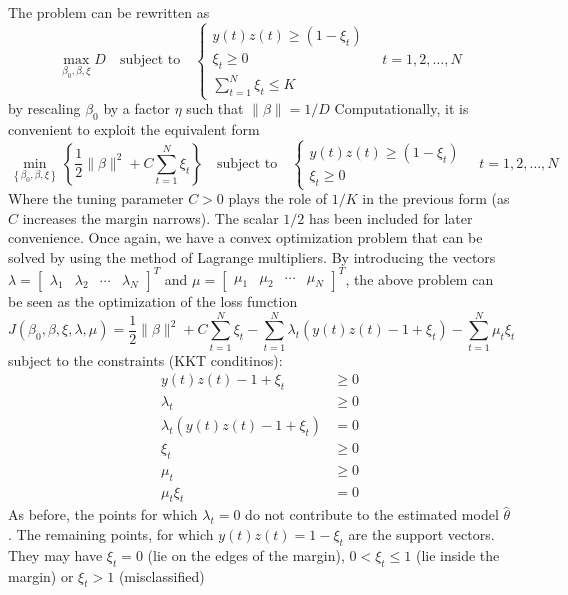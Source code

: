 \documentclass{book}
\theoremstyle{definition}
\theoremstyle{remark}
\theoremstyle{remark}
\begin{document}
The problem can be rewritten as 
\[
  \max_{\beta_0,\beta,\xi}D \quad \text{subject to} \quad \begin{cases}
    y(t)z(t)\geq (1-\xi_t)\\
    \xi_t \geq 0 \\
    \displaystyle\sum_{t=1}^{N}\xi_t \leq K
  \end{cases}\quad t=1,2,\dots,N
\]
by rescaling $\beta_0$ by a factor $\eta$ such that $\|\beta\|=1/D$ 
Computationally, it is convenient to exploit the equivalent form 
\[
    \min_{\left\{\beta_0,\beta,\xi\right\}}\left\{\displaystyle\frac{1}{2}\|\beta\|^2+C\displaystyle\sum_{t=1}^{N}\xi_t\right\} \quad \text{subject to}\quad \begin{cases}
    y(t)z(t) \geq (1-\xi_t)\\
    \xi_t \geq 0
  \end{cases} \quad t=1,2,\dots,N
\]
Where the tuning parameter $C>0$ plays the role of $1/K$ in the previous form (as $C$ increases the margin narrows). The scalar $1/2$ has been included for later convenience. Once again, we have a convex optimization problem that can be solved by using the method of Lagrange multipliers. By introducing the vectors $\lambda=\begin{bmatrix}
  \lambda_1 & \lambda_2 & \cdots & \lambda_N
\end{bmatrix}^T$ and $\mu=\begin{bmatrix}
  \mu_1 & \mu_2 & \cdots & \mu_N
\end{bmatrix}^T$, the above problem can be seen as the optimization of the loss function 
\[
  J(\beta_0,\beta,\xi,\lambda,\mu)=\displaystyle\frac{1}{2}\|\beta\|^2+C\displaystyle\sum_{t=1}^{N}\xi_t-\displaystyle\sum_{t=1}^{N}\lambda_t(y(t)z(t)-1+\xi_t)-\displaystyle\sum_{t=1}^{N}\mu_t\xi_t
\]
subject to the constraints (KKT conditinos): 
\begin{align*}
    y(t)z(t)-1+\xi_t &\geq 0\\
    \lambda_t &\geq 0\\
    \lambda_t\left(y(t)z(t)-1+\xi_t\right)&=0\\
    \xi_t &\geq0\\
    \mu_t &\geq 0 \\
    \mu_t\xi_t &= 0
\end{align*}
As before, the points for which $\lambda_t=0$ do not contribute to the estimated model $\hat{\theta}$. The remaining points, for which $y(t)z(t)=1-\xi_t$ are the support vectors. They may have $\xi_t=0$ (lie on the edges of the margin), $0<\xi_t\leq 1$ (lie inside the margin) or $\xi_t>1$ (misclassified)
\end{document}
